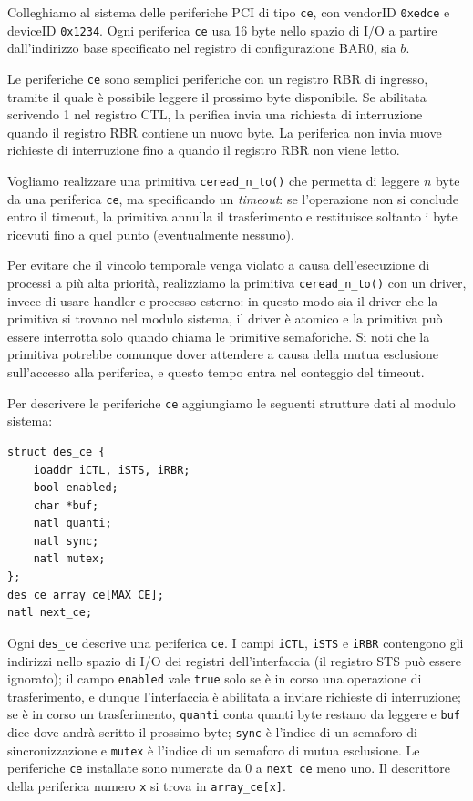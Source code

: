 Colleghiamo al sistema delle periferiche PCI di tipo \verb|ce|, con vendorID \verb|0xedce| e deviceID \verb|0x1234|.
Ogni periferica \verb|ce| usa 16 byte nello spazio di I/O a partire dall'indirizzo base specificato nel
registro di configurazione BAR0, sia $b$.

Le periferiche \verb|ce| sono semplici periferiche con un registro RBR di ingresso,
tramite il quale \`e possibile leggere il prossimo byte disponibile. 
Se abilitata scrivendo 1 nel registro CTL, la perifica invia una richiesta di
interruzione quando il registro RBR contiene un nuovo byte. La periferica non invia
nuove richieste di interruzione fino a quando il registro RBR non viene letto.

Vogliamo realizzare una primitiva \verb|ceread_n_to()| che permetta di leggere $n$ byte
da una periferica \verb|ce|, ma specificando un {\em timeout}: se l'operazione non
si conclude entro il timeout, la primitiva annulla il trasferimento e restituisce
soltanto i byte ricevuti fino a quel punto (eventualmente nessuno).

Per evitare che il vincolo temporale venga violato a causa dell'esecuzione
di processi a pi\`u alta priorit\`a, realizziamo la primitiva \verb|ceread_n_to()| con
un driver, invece di usare handler e processo esterno: in questo modo sia il driver che la primitiva
si trovano nel modulo sistema, il driver \`e atomico e la primitiva pu\`o essere interrotta
solo quando chiama le primitive semaforiche. Si noti che la primitiva potrebbe comunque dover
attendere a causa della mutua esclusione sull'accesso alla periferica, e questo tempo entra
nel conteggio del timeout.

Per descrivere le periferiche \verb|ce| aggiungiamo le seguenti strutture dati al modulo sistema:
\begin{verbatim}
struct des_ce {
    ioaddr iCTL, iSTS, iRBR;
    bool enabled;
    char *buf;
    natl quanti;
    natl sync;
    natl mutex;
};
des_ce array_ce[MAX_CE];
natl next_ce;
\end{verbatim}
Ogni \verb|des_ce| descrive una periferica \verb|ce|.
I campi \verb|iCTL|, \verb|iSTS| e \verb|iRBR| contengono gli indirizzi nello spazio di I/O dei
registri dell'interfaccia (il registro STS pu\`o essere ignorato); il campo \verb|enabled| vale \verb|true| solo se \`e in corso una
operazione di trasferimento, e dunque l'interfaccia \`e abilitata a inviare richieste di interruzione;
se \`e in corso un trasferimento, \verb|quanti| conta quanti byte restano da leggere e \verb|buf|
dice dove andr\`a scritto il prossimo byte; \verb|sync| \`e l'indice di un semaforo di sincronizzazione
e \verb|mutex| \`e l'indice di un semaforo di mutua esclusione.
Le periferiche \verb|ce| installate sono numerate da 0 a \verb|next_ce| meno uno.
Il descrittore della periferica numero \verb|x| si trova in \verb|array_ce[x]|.

